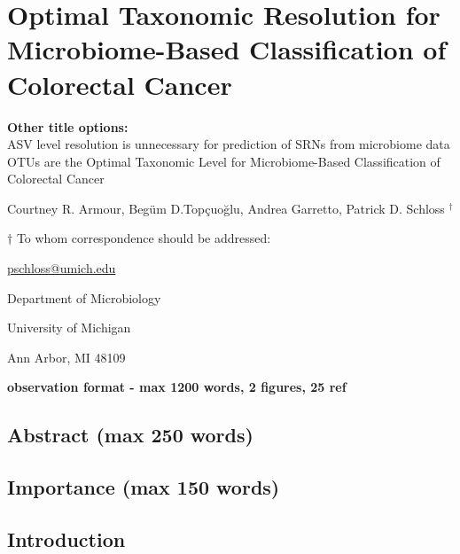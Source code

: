 \documentclass[
]{article}
\author{}
\date{\vspace{-2.5em}}
\begin{document}
\hypertarget{optimal-taxonomic-resolution-for-microbiome-based-classification-of-colorectal-cancer}{%
\section{Optimal Taxonomic Resolution for Microbiome-Based
Classification of Colorectal
Cancer}\label{optimal-taxonomic-resolution-for-microbiome-based-classification-of-colorectal-cancer}}

\vspace{20mm}

\textbf{Other title options:}\\
ASV level resolution is unnecessary for prediction of SRNs from
microbiome data\\
OTUs are the Optimal Taxonomic Level for Microbiome-Based Classification
of Colorectal Cancer

\vspace{10mm}

Courtney R. Armour, Begüm D.Topçuoğlu, Andrea Garretto, Patrick D.
Schloss \({^\dagger}\)

\vspace{20mm}

\({\dagger}\) To whom correspondence should be addressed:

\href{mailto:pschloss@umich.edu}{pschloss@umich.edu}

Department of Microbiology

University of Michigan

Ann Arbor, MI 48109

\vspace{20mm}

\textbf{observation format - max 1200 words, 2 figures, 25 ref}

\newpage

\hypertarget{abstract-max-250-words}{%
\subsection{Abstract (max 250 words)}\label{abstract-max-250-words}}

\hypertarget{importance-max-150-words}{%
\subsection{Importance (max 150 words)}\label{importance-max-150-words}}

\newpage

\hypertarget{introduction}{%
\subsection{Introduction}\label{introduction}}
\end{document}
